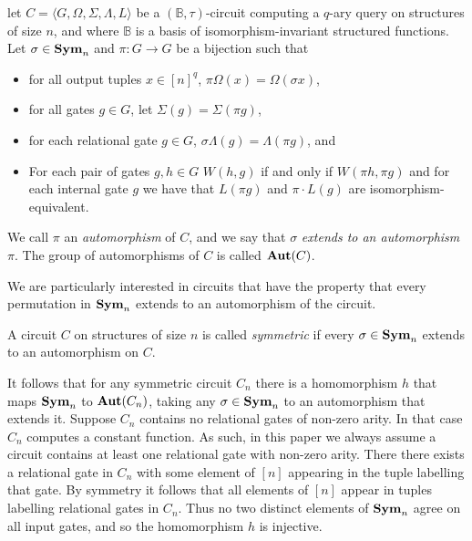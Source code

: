 \documentclass[../paper.tex]{subfiles}
\begin{document}
\begin{definition}[Automorphism]
  let $C = \langle G, \Omega, \Sigma, \Lambda, L\rangle$ be a
  $(\mathbb{B},\tau)$-circuit computing a $q$-ary query on structures of size
  $n$, and where $\mathbb{B}$ is a basis of isomorphism-invariant structured
  functions. Let $\sigma \in \text{\textbf{Sym}}_n$ and $\pi: G \rightarrow G$ be a bijection
  such that
  \begin{itemize}
    \setlength\itemsep{0mm}
  \item for all output tuples $x \in [n]^q$, $\pi \Omega (x) = \Omega (\sigma
    x)$,
  \item for all gates $g \in G$, let $\Sigma (g) = \Sigma (\pi g)$,
  \item for each relational gate $g \in G$, $\sigma \Lambda (g) = \Lambda (\pi
    g)$, and
  \item For each pair of gates $g, h \in G$ $W(h,g)$ if and only if $W(\pi h,
    \pi g)$ and for each internal gate $g$ we have that $L(\pi g)$ and $ \pi
    \cdot L(g)$ are isomorphism-equivalent.
  \end{itemize}
  We call $\pi$ an \emph{automorphism} of $C$, and we say that $\sigma$
  \emph{extends to an automorphism} $\pi$. The group of automorphisms of $C$ is
  called $\text{\textbf{Aut}} (C)$.
\end{definition}

We are particularly interested in circuits that have the property that every
permutation in $\text{\textbf{Sym}}_n$ extends to an automorphism of the circuit.

\begin{definition}[Symmetry]
  A circuit $C$ on structures of size $n$ is called \emph{symmetric} if every
  $\sigma \in \text{\textbf{Sym}}_n$ extends to an automorphism on $C$.
\end{definition}

It follows that for any symmetric circuit $C_n$ there is a homomorphism $h$ that
maps $\text{\textbf{Sym}}_n$ to $\text{\textbf{Aut}}(C_n)$, taking any $\sigma \in \text{\textbf{Sym}}_n$ to an automorphism
that extends it. Suppose $C_n$ contains no relational gates of non-zero arity.
In that case $C_n$ computes a constant function. As such, in this paper we
always assume a circuit contains at least one relational gate with non-zero
arity. There there exists a relational gate in $C_n$ with some element of $[n]$
appearing in the tuple labelling that gate. By symmetry it follows that all
elements of $[n]$ appear in tuples labelling relational gates in $C_n$. Thus no
two distinct elements of $\text{\textbf{Sym}}_n$ agree on all input gates, and so the
homomorphism $h$ is injective.
\end{document}
